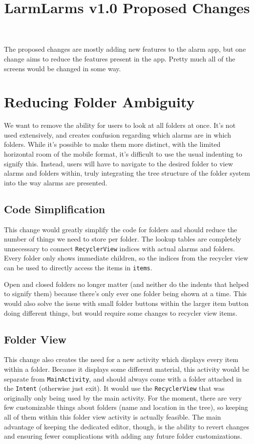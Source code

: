 \documentclass[11pt]{article} %
\title{LarmLarms v1.0 Proposed Changes}
\author{}
\begin{document}
\maketitle

\tableofcontents
\newpage

The proposed changes are mostly adding new features to the alarm app, but one change aims to reduce the features present in the app. Pretty much all of the screens would be changed in some way.

\section{Reducing Folder Ambiguity}
\label{sec:noOpenFolders}
We want to remove the ability for users to look at all folders at once. It's not used extensively, and creates confusion regarding which alarms are in which folders. While it's possible to make them more distinct, with the limited horizontal room of the mobile format, it's difficult to use the usual indenting to signify this. Instead, users will have to navigate to the desired folder to view alarms and folders within, truly integrating the tree structure of the folder system into the way alarms are presented.

\subsection{Code Simplification}
\label{sec:folderSimple}
This change would greatly simplify the code for folders and should reduce the number of things we need to store per folder. The lookup tables are completely unnecessary to connect \verb|RecyclerView| indices with actual alarms and folders. Every folder only shows immediate children, so the indices from the recycler view can be used to directly access the items in \verb|items|.

Open and closed folders no longer matter (and neither do the indents that helped to signify them) because there's only ever one folder being shown at a time. This would also solve the issue with small folder buttons within the larger item button doing different things, but would require some changes to recycler view items.

\subsection{Folder View}
This change also creates the need for a new activity which displays every item within a folder. Because it displays some different material, this activity would be separate from \verb|MainActivity|, and should always come with a folder attached in the \verb|Intent| (otherwise just exit). It would use the \verb|RecyclerView| that was originally only being used by the main activity. For the moment, there are very few customizable things about folders (name and location in the tree), so keeping all of them within this folder view activity is actually feasible. The main advantage of keeping the dedicated editor, though, is the ability to revert changes and ensuring fewer complications with adding any future folder customizations. 
\end{document}
